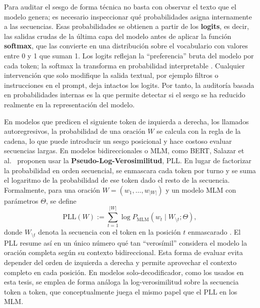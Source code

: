 \documentclass[12pt,a4paper]{report}
\begin{document}
Para auditar el sesgo de forma técnica no basta con observar el texto que el modelo genera; es necesario inspeccionar qué probabilidades asigna internamente a las secuencias. Esas probabilidades se obtienen a partir de los \textbf{logits}, es decir, las salidas crudas de la última capa del modelo antes de aplicar la función \textbf{softmax}, que las convierte en una distribución sobre el vocabulario con valores entre 0 y 1 que suman 1. Los logits reflejan la ``preferencia'' bruta del modelo por cada token; la softmax la transforma en probabilidad interpretable \cite{salazar_masked_2020}. Cualquier intervención que solo modifique la salida textual, por ejemplo filtros o instrucciones en el prompt, deja intactos los logits. Por tanto, la auditoría basada en probabilidades internas es la que permite detectar si el sesgo se ha reducido realmente en la representación del modelo.

En modelos que predicen el siguiente token de izquierda a derecha, los llamados autoregresivos, la probabilidad de una oración $W$ se calcula con la regla de la cadena, lo que puede introducir un sesgo posicional y hace costoso evaluar secuencias largas. En modelos bidireccionales o MLM, como BERT, Salazar et al.\ \cite{salazar_masked_2020} proponen usar la \textbf{Pseudo-Log-Verosimilitud}, PLL. En lugar de factorizar la probabilidad en orden secuencial, se enmascara cada token por turno y se suma el logaritmo de la probabilidad de ese token dado el resto de la secuencia. Formalmente, para una oración $W = (w_1, \ldots, w_{|W|})$ y un modelo MLM con parámetros $\Theta$, se define
\begin{equation}
    \text{PLL}(W) := \sum_{t=1}^{|W|} \log P_{\text{MLM}}(w_t \mid W_{\setminus t}; \Theta),
\end{equation}
donde $W_{\setminus t}$ denota la secuencia con el token en la posición $t$ enmascarado \cite{salazar_masked_2020}. El PLL resume así en un único número qué tan ``verosímil'' considera el modelo la oración completa según su contexto bidireccional. Esta forma de evaluar evita depender del orden de izquierda a derecha y permite aprovechar el contexto completo en cada posición. En modelos solo-decodificador, como los usados en esta tesis, se emplea de forma análoga la log-verosimilitud sobre la secuencia token a token, que conceptualmente juega el mismo papel que el PLL en los MLM.
\end{document}
